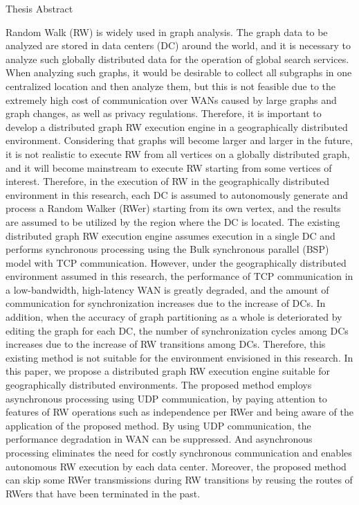 \begin{center}
  \Huge{Thesis Abstract}\\
  \vspace{10pt}
  \large{}
\end{center}


Random Walk (RW) is widely used in graph analysis. The graph data to be analyzed are stored in data centers (DC) around the world, and it is necessary to analyze such globally distributed data for the operation of global search services. When analyzing such graphs, it would be desirable to collect all subgraphs in one centralized location and then analyze them, but this is not feasible due to the extremely high cost of communication over WANs caused by large graphs and graph changes, as well as privacy regulations. Therefore, it is important to develop a distributed graph RW execution engine in a geographically distributed environment. 
Considering that graphs will become larger and larger in the future, it is not realistic to execute RW from all vertices on a globally distributed graph, and it will become mainstream to execute RW starting from some vertices of interest. Therefore, in the execution of RW in the geographically distributed environment in this research, each DC is assumed to autonomously generate and process a Random Walker (RWer) starting from its own vertex, and the results are assumed to be utilized by the region where the DC is located. 
The existing distributed graph RW execution engine assumes execution in a single DC and performs synchronous processing using the Bulk synchronous parallel (BSP) model with TCP communication. However, under the geographically distributed environment assumed in this research, the performance of TCP communication in a low-bandwidth, high-latency WAN is greatly degraded, and the amount of communication for synchronization increases due to the increase of DCs. In addition, when the accuracy of graph partitioning as a whole is deteriorated by editing the graph for each DC, the number of synchronization cycles among DCs increases due to the increase of RW transitions among DCs. Therefore, this existing method is not suitable for the environment envisioned in this research.
In this paper, we propose a distributed graph RW execution engine suitable for geographically distributed environments. The proposed method employs asynchronous processing using UDP communication, by paying attention to features of RW operations such as independence per RWer and being aware of the application of the proposed method. By using UDP communication, the performance degradation in WAN can be suppressed. And asynchronous processing eliminates the need for costly synchronous communication and enables autonomous RW execution by each data center. Moreover, the proposed method can skip some RWer transmissions during RW transitions by reusing the routes of RWers that have been terminated in the past.

